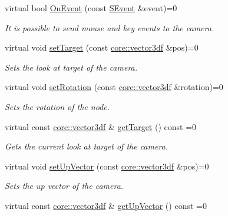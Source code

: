 \begin{DoxyCompactItemize}
\item 
virtual bool \hyperlink{classirr_1_1scene_1_1ICameraSceneNode_af27145518f43a17f803cdea086f68f3c}{On\+Event} (const \hyperlink{structirr_1_1SEvent}{S\+Event} \&event)=0
\begin{DoxyCompactList}\small\item\em It is possible to send mouse and key events to the camera. \end{DoxyCompactList}\item 
virtual void \hyperlink{classirr_1_1scene_1_1ICameraSceneNode_a7280b07fd7915c64350db5a132b4ba07}{set\+Target} (const \hyperlink{namespaceirr_1_1core_a06f169d08b5c429f5575acb7edbad811}{core\+::vector3df} \&pos)=0
\begin{DoxyCompactList}\small\item\em Sets the look at target of the camera. \end{DoxyCompactList}\item 
virtual void \hyperlink{classirr_1_1scene_1_1ICameraSceneNode_af95d5f50c192f212e11f3f050e92a470}{set\+Rotation} (const \hyperlink{namespaceirr_1_1core_a06f169d08b5c429f5575acb7edbad811}{core\+::vector3df} \&rotation)=0
\begin{DoxyCompactList}\small\item\em Sets the rotation of the node. \end{DoxyCompactList}\item 
virtual const \hyperlink{namespaceirr_1_1core_a06f169d08b5c429f5575acb7edbad811}{core\+::vector3df} \& \hyperlink{classirr_1_1scene_1_1ICameraSceneNode_a49991f078c8eedc2581a1f2fa059d040}{get\+Target} () const  =0
\begin{DoxyCompactList}\small\item\em Gets the current look at target of the camera. \end{DoxyCompactList}\item 
virtual void \hyperlink{classirr_1_1scene_1_1ICameraSceneNode_a1e74c17d89979fde4738276ccdcc0d3a}{set\+Up\+Vector} (const \hyperlink{namespaceirr_1_1core_a06f169d08b5c429f5575acb7edbad811}{core\+::vector3df} \&pos)=0
\begin{DoxyCompactList}\small\item\em Sets the up vector of the camera. \end{DoxyCompactList}\item 
virtual const \hyperlink{namespaceirr_1_1core_a06f169d08b5c429f5575acb7edbad811}{core\+::vector3df} \& \hyperlink{classirr_1_1scene_1_1ICameraSceneNode_a9e5a0aae5899fe4adafb597b416fccf0}{get\+Up\+Vector} () const  =0

\end{DoxyCompactItemize}
